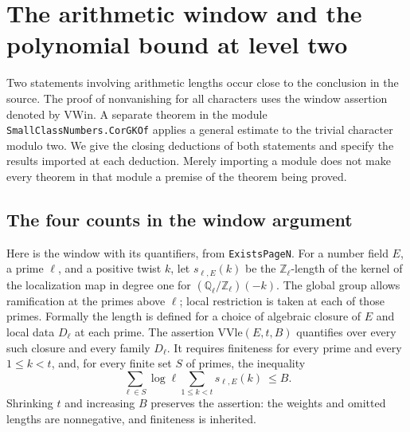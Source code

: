 \section{The arithmetic window and the polynomial bound at level two}
\label{sec:arithmetic-translation}

Two statements involving arithmetic lengths occur close to the conclusion in
the source. The proof of nonvanishing for all characters uses the window
assertion denoted by \(\mathrm{VWin}\). A separate theorem in the module
\texttt{Small\allowbreak{}Class\allowbreak{}Numbers.\allowbreak{}Cor\allowbreak{}GKOf} applies a general estimate to the trivial
character modulo two. We give the closing deductions of both statements and
specify the results imported at each deduction. Merely importing a module does
not make every theorem in that module a premise of the theorem being proved.

\subsection{The four counts in the window argument}

Here is the window with its quantifiers, from \texttt{Exists\allowbreak{}Page\allowbreak{}N}. For a
number field \(E\), a prime \(\ell\), and a positive twist \(k\), let
\(s_{\ell,E}(k)\) be the \(\mathbb Z_\ell\)-length of the kernel of the
localization map in degree one for
\((\mathbb Q_\ell/\mathbb Z_\ell)(-k)\). The global group allows
ramification at the primes above \(\ell\); local restriction is taken at
each of those primes. Formally the length is defined for a choice of
algebraic closure of \(E\) and local data \(D_\ell\) at each prime.
The assertion \(\mathrm{VVle}(E,t,B)\) quantifies over every such closure
and every family \(D_\ell\). It requires finiteness for every prime and
every \(1\le k<t\), and, for every finite set \(S\) of primes, the inequality
\[
  \sum_{\ell\in S}\log\ell\sum_{1\le k<t}s_{\ell,E}(k)\ \le B.
\]
Shrinking \(t\) and increasing \(B\) preserves the assertion: the
weights and omitted lengths are nonnegative, and finiteness is inherited.

